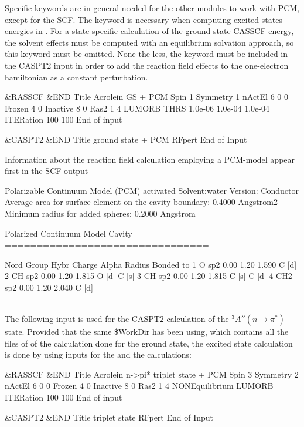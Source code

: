 Specific keywords are in general needed for the other modules to work with PCM, except for
the SCF. The keyword  is
necessary when computing excited states energies in .
For a state specific calculation of the ground state CASSCF energy, the solvent effects
must be computed with an equilibrium solvation approach, so this keyword must be omitted.
None the less, the keyword  must be included in the CASPT2 input
in order to add
the reaction field effects to the one-electron hamiltonian as a constant perturbation.

\begin{inputlisting}
 &RASSCF &END
Title
Acrolein GS + PCM
Spin
 1
Symmetry
 1
nActEl
 6 0 0
Frozen
 4 0
Inactive
 8 0
Ras2
 1 4
LUMORB
THRS
1.0e-06 1.0e-04 1.0e-04
ITERation
 100 100
End of input

 &CASPT2 &END
Title
 ground state + PCM
RFpert
End of Input

\end{inputlisting}

Information about the reaction field calculation employing
a PCM-model appear first in the SCF output

\begin{sourcelisting}
Polarizable Continuum Model (PCM) activated
Solvent:water
Version: Conductor
Average area for surface element on the cavity boundary: 0.4000 Angstrom2
Minimum radius for added spheres: 0.2000 Angstrom



Polarized Continuum Model Cavity
================================

 Nord Group  Hybr  Charge Alpha Radius  	  Bonded to
   1   O     sp2   0.00   1.20  1.590	  C   [d]
   2   CH    sp2   0.00   1.20  1.815	  O   [d]  C   [s]
   3   CH    sp2   0.00   1.20  1.815	  C   [s]  C   [d]
   4   CH2   sp2   0.00   1.20  2.040	  C   [d]
 ------------------------------------------------------------------------------
\end{sourcelisting}

The following input is used for the CASPT2 calculation of the $^3A''(n\rightarrow\pi^*)$ state. 
Provided that the same \$WorkDir has been using, which contains all the files of of the
calculation done for the ground state, the excited state calculation is done
by using inputs for the  
and the  calculations:

\begin{sourcelisting}
 &RASSCF &END
Title
Acrolein n->pi* triplet state + PCM
Spin
 3
Symmetry
 2
nActEl
 6 0 0
Frozen
 4 0
Inactive
 8 0
Ras2
 1 4
NONEquilibrium
LUMORB
ITERation
 100 100
End of input

 &CASPT2 &END
Title
 triplet state
RFpert
End of Input

\end{sourcelisting}

